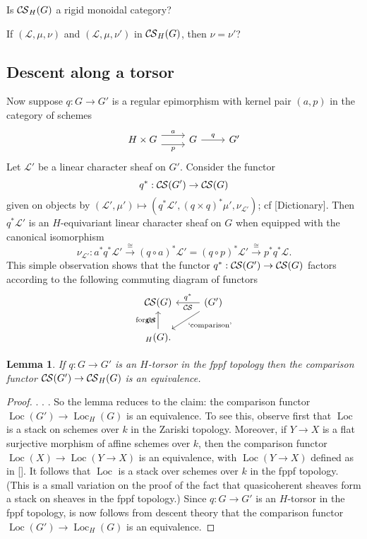 \documentclass[10pt]{amsart}
\theoremstyle{plain}
\newtheorem{lemma}[theorem]{Lemma}
\theoremstyle{definition}
\newcommand{\Fq}{k}
\DeclareMathOperator{\Loc}{Loc}
\newcommand{\iso}{{\ \cong\ }}
\newcommand{\cs}[1]{{\mathcal{#1}}}
\newcommand{\CS}{{\mathcal{C\hskip-0.8pt S}}}
\begin{document}
Is $\CS_H(G)$ a rigid monoidal category?

If $(\cs{L},\mu,\nu)$ and $(\cs{L},\mu,\nu')$ in $\CS_H(G)$, then $\nu = \nu'$?

\subsection{Descent along a torsor}

Now suppose $q : G \to G'$ is a regular epimorphism with kernel pair $(a,p)$ in the category of schemes
\[
\begin{tikzcd}
H\times G
 \arrow[shift left=2]{r}{a}
  \arrow[shift right=2,swap]{r}{p}
&
G 
\arrow{r}{q}
& 
G'
\end{tikzcd}
\]
Let $\cs{L}'$ be a linear character sheaf on $G'$.
Consider the functor
\[
q^* : \CS(G') \to \CS(G)
\]
given on objects by $(\cs{L}',\mu') \mapsto (q^*\cs{L}', (q\times q)^* \mu', \nu_{\cs{L}'})$; cf [Dictionary].
Then $q^*\cs{L}'$ is an $H$-equivariant linear character sheaf on $G$ when equipped with the canonical isomorphism
\[
\nu_{\cs{L}'} : a^* q^* \cs{L}' \mathop{\longrightarrow}\limits^{\iso} (q\circ a)^* \cs{L}' = (q\circ p)^*\cs{L}' \mathop{\longrightarrow}\limits^{\iso} p^* q^*\cs{L}.
\]
This simple observation shows that the functor $q^* : \CS(G') \to \CS(G)$  factors according to the following commuting diagram of functors
\[
\begin{tikzcd}
\CS(G) &\arrow{l}[swap]{q^*} 
\CS(G') \arrow{dl}{\text{`comparison'}}\\
\arrow{u}{\text{forget}} \CS_{H}(G). & 
\end{tikzcd}
\]

\begin{lemma}
If $q : G \to G'$ is an $H$-torsor in the fppf topology then the comparison functor $\CS(G') \to \CS_H(G)$ is an equivalence.
\end{lemma}

\begin{proof}
. . . 
So the lemma reduces to the claim: the comparison functor $\Loc(G') \to \Loc_H(G)$ is an equivalence. 
To see this, observe first that $\Loc$ is a stack on schemes over $\Fq$ in the Zariski topology.
Moreover, if $Y \to X$ is a flat surjective morphism of affine schemes over $\Fq$, then the comparison functor $\Loc(X) \to \Loc(Y\to X)$ is an equivalence, with $\Loc(Y\to X)$ defined as in [].
It follows that $\Loc$ is a stack over schemes over $\Fq$ in the fppf topology.
(This is a small variation on the proof of the fact that quasicoherent sheaves form a stack on sheaves in the fppf topology.)
Since $q : G\to G'$ is an $H$-torsor in the fppf topology, is now follows from descent theory that the comparison functor $\Loc(G') \to \Loc_H(G)$ is an equivalence.
\end{proof}
\end{document}
